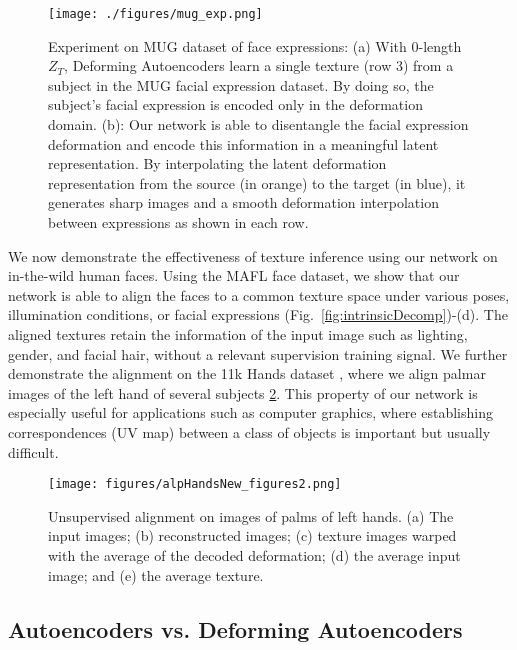 \documentclass[runningheads]{llncs}
\begin{document}
\begin{figure}
    \centering
    \texttt{[image: ./figures/mug\_exp.png]}
    \caption{ Experiment on MUG dataset of face expressions: (a) With 0-length $Z_T$, Deforming Autoencoders learn a single texture (row 3) from a subject in the MUG facial expression dataset. By doing so, the subject's facial expression is encoded only in the deformation domain.
    (b): Our network is able to disentangle the facial expression deformation and encode this information in a meaningful latent representation. By interpolating the latent deformation representation from the source (in orange) to the target (in blue), it generates sharp images and a smooth deformation interpolation between expressions as shown in each row.
    }
    \label{fig:MUG_1}
\end{figure}

We now demonstrate the effectiveness of texture inference using our network on in-the-wild human faces. Using the MAFL face dataset, we show that our network is able to align the faces to a common texture space under various poses, illumination conditions, or facial expressions (Fig.~\ref{fig:intrinsicDecomp})-(d). The aligned textures retain the information of the input image such as lighting, gender, and facial hair, without a relevant supervision training signal. We further demonstrate the alignment on the 11k Hands dataset \cite{afifiHands}, where
we align palmar images of the left hand of several subjects \ref{fig:alpHandsNew}. This property of our network is especially useful for applications such as computer graphics, where  establishing correspondences (UV map) between a class of objects is important but usually difficult.

\begin{figure}[ht!]
 \centering
 \texttt{[image: figures/alpHandsNew\_figures2.png]}
 \caption{Unsupervised alignment on images of palms of left hands. (a) The input images; (b) reconstructed images; (c) texture images warped with the average of the decoded deformation; (d) the average input image; and (e) the average texture.}
 \label{fig:alpHandsNew}
  \vspace{-0.5cm}
\end{figure}


\subsection{Autoencoders vs. Deforming Autoencoders}
\end{document}
